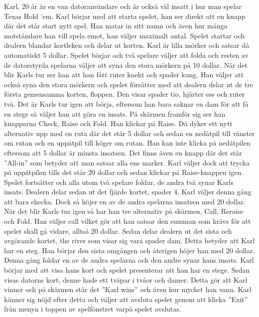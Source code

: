 \documentclass[10pt,a4paper]{article}
\begin{document}
\vspace{1em}
\noindent
Karl, 20 år är en van datoranvändare och är också väl insatt i hur man
spelar Texas Hold ’em. Karl börjar med att starta spelet, han ser direkt
att en knapp där det står start nytt spel. Han matar in sitt namn och även
hur många motståndare han vill spela emot, han väljer maximalt antal.
Spelet startar och dealern blandar kortleken och delar ut korten. Karl är
lilla mörker och satsar då automatiskt 5 dollar. Spelet börjar och två
spelare väljer att folda och resten av de datorstyrda spelarna väljer att
syna den stora mörkern på 10 dollar. När det blir Karls tur ser han att han
fått ruter knekt och spader kung. Han väljer att också syna den stora
mörkern och spelet försätter med att dealern delar ut de tre första
gemensamma korten, floppen. Den visar spader tio, hjärter ess och ruter
två. Det är Karls tur igen att börja, eftersom han bara saknar en dam för
att få en stege så väljer han att göra en insats. På skärmen framför sig
ser han knapparna Check, Raise och Fold. Han klickar på Raise. Då dyker ett
nytt alternativ upp med en ruta där det står 5 dollar och sedan en nedåtpil
till vänster om rutan och en uppåtpil till höger om rutan. Han kan inte
klicka på nedåtpilen eftersom att 5 dollar är minsta insatsen. Det finns
även en knapp där det står ”All-in” som betyder att man satsar alla ens
marker. Karl väljer dock att trycka på uppåtpilen tills det står 20 dollar
och sedan klickar på Raise-knappen igen. Spelet fortsätter och alla utom
två spelare foldar, de andra två synar Karls insats. Dealern delar sedan ut
det fjärde kortet, spader 4. Karl väljer denna gång att bara checka. Dock
så höjer en av de andra spelarna insatsen med 20 dollar. När det blir Karls
tur igen så har han tre alternativ på skärmen, Call, Reraise och Fold. Han
väljer call vilket gör att han satsar den summan som krävs för att spelet
skall gå vidare, alltså 20 dollar. Sedan delar dealern ut det sista och
avgörande kortet, the river som visar sig vara spader dam. Detta betyder
att Karl har en steg. Han börjar den sista omgången och återigen höjer han
med 20 dollar. Denna gång foldar en av de andra spelarna och den andre
synar hans insats. Karl börjar med att visa hans kort och spelet
presenterar att han har en stege. Sedan visas datorns kort, denne hade ett
tvåpar i tvåor och damer. Detta gör att Karl vinner och på skärmen står det
”Karl wins” och även hur mycket han vann. Karl känner sig nöjd efter detta
och väljer att avsluta spelet genom att klicka ”Exit” från menyn i toppen
av spelfönstret varpå spelet avslutas.
\end{document}
